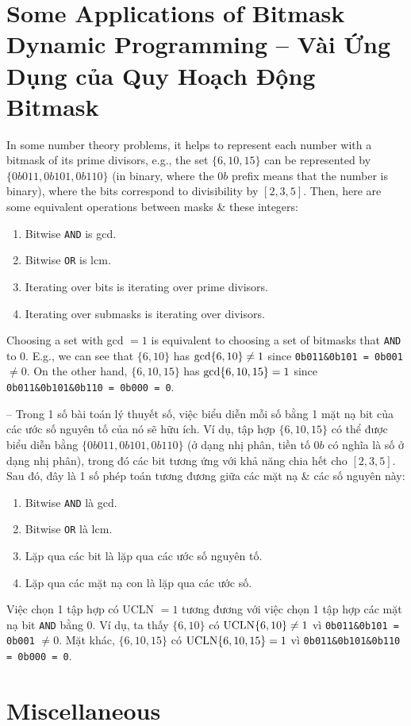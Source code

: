 \documentclass{article}
\begin{document}

\section{Some Applications of Bitmask Dynamic Programming -- Vài Ứng Dụng của Quy Hoạch Động Bitmask}
In some number theory problems, it helps to represent each number with a bitmask of its prime divisors, e.g., the set $\{6,10,15\}$ can be represented by $\{0b011,0b101,0b110\}$ (in binary, where the $0b$ prefix means that the number is binary), where the bits correspond to divisibility by $[2,3,5]$. Then, here are some equivalent operations between masks \& these integers:
\begin{enumerate}
    \item Bitwise {\tt AND} is gcd.
    \item Bitwise {\tt OR} is lcm.
    \item Iterating over bits is iterating over prime divisors.
    \item Iterating over submasks is iterating over divisors.
\end{enumerate}
Choosing a set with gcd $= 1$ is equivalent to choosing a set of bitmasks that {\tt AND} to 0. E.g., we can see that $\{6,10\}$ has ${\rm gcd}\{6,10\}\ne1$ since \verb|0b011&0b101 = 0b001| $\ne 0$. On the other hand, $\{6,10,15\}$ has ${\rm gcd}\{6,10,15\} = 1$ since \verb|0b011&0b101&0b110 = 0b000 = 0|.

-- Trong 1 số bài toán lý thuyết số, việc biểu diễn mỗi số bằng 1 mặt nạ bit của các ước số nguyên tố của nó sẽ hữu ích. Ví dụ, tập hợp $\{6,10,15\}$ có thể được biểu diễn bằng $\{0b011,0b101,0b110\}$ (ở dạng nhị phân, tiền tố $0b$ có nghĩa là số ở dạng nhị phân), trong đó các bit tương ứng với khả năng chia hết cho $[2,3,5]$. Sau đó, đây là 1 số phép toán tương đương giữa các mặt nạ \& các số nguyên này:

\begin{enumerate}
    \item Bitwise {\tt AND} là gcd.
    \item Bitwise {\tt OR} là lcm.
    \item Lặp qua các bit là lặp qua các ước số nguyên tố.
    \item Lặp qua các mặt nạ con là lặp qua các ước số.
\end{enumerate}
Việc chọn 1 tập hợp có UCLN $= 1$ tương đương với việc chọn 1 tập hợp các mặt nạ bit {\tt AND} bằng 0. Ví dụ, ta thấy $\{6,10\}$ có ${\rm UCLN}\{6,10\}\ne1$ vì \verb|0b011&0b101 = 0b001| $\ne 0$. Mặt khác, $\{6,10,15\}$ có ${\rm UCLN}\{6,10,15\} = 1$ vì \verb|0b011&0b101&0b110 = 0b000 = 0|.


\section{Miscellaneous}


\printbibliography[heading=bibintoc]
\end{document}
